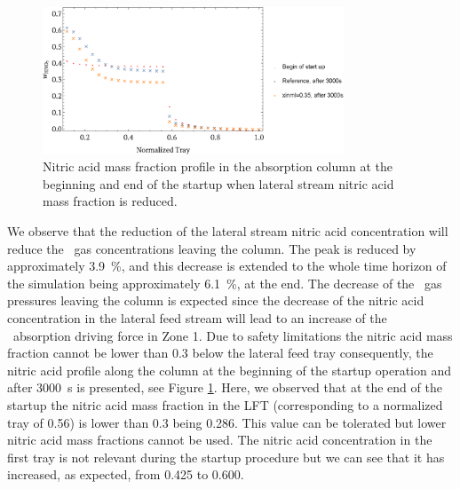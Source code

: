 \documentclass[journal=jacsat,manuscript=article]{achemso}
\newcommand{\nox}{\ce{NO_{\rmfamily{x}}}}
\begin{document}
\begin{figure}[htb]
	\centering
	\includegraphics[width=0.8\textwidth]{figure7.eps}
	\caption{Nitric acid mass fraction profile in the absorption column at the beginning and end of the startup when lateral stream nitric acid mass fraction is reduced.} 	
	\label{fig:startwperfil}
\end{figure}
We observe that the reduction of the lateral stream nitric acid concentration will reduce the \nox~gas concentrations leaving the column. The peak is reduced by approximately \SI{3.9}{\percent}, and this decrease is extended to the whole time horizon of the simulation being approximately \SI{6.1}{\percent}, at the end.
The decrease of the \nox~gas pressures leaving the column is expected since the decrease of the nitric acid concentration in the lateral feed stream will lead to an increase of the \nox~absorption driving force in Zone 1. 
Due to safety limitations the nitric acid mass fraction cannot be lower than 0.3 below the lateral feed tray consequently, the nitric acid profile along the column at the beginning of the startup operation and after \SI{3000}{\second} is presented, see
Figure \ref{fig:startwperfil}. Here, we observed that at the end of the startup the nitric acid mass fraction in the LFT (corresponding to a normalized tray of 0.56) is lower than 0.3 being 0.286. This value can be tolerated but lower nitric acid mass fractions cannot be used. The nitric acid concentration in the first tray is not relevant during the startup procedure but we can see that it has increased, as expected, from 0.425 to 0.600. 
\end{document}
